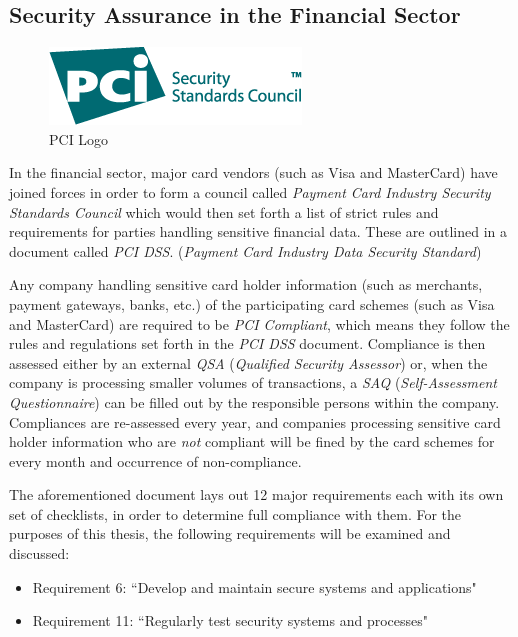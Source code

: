 \documentclass[a4paper,12pt]{article}
\begin{document}
\subsection{Security Assurance in the Financial Sector}

	\begin{figure}
		\vspace{-10pt}
		\centering
		\includegraphics[scale=0.5]{pci.png}
		\caption{PCI Logo}
	\end{figure}

	In the financial sector, major card vendors (such as Visa and MasterCard) have joined forces in order to form a council called \textit{Payment Card Industry Security Standards Council} which would then set forth a list of strict rules and requirements for parties handling sensitive financial data. These are outlined in a document called \textit{PCI DSS}. (\textit{Payment Card Industry Data Security Standard})
	
	Any company handling sensitive card holder information (such as merchants, payment gateways, banks, etc.) of the participating card schemes (such as Visa and MasterCard) are required to be \textit{PCI Compliant}, which means they follow the rules and regulations set forth in the \textit{PCI DSS} document. Compliance is then assessed either by an external \textit{QSA} (\textit{Qualified Security Assessor}) or, when the company is processing smaller volumes of transactions, a \textit{SAQ} (\textit{Self-Assessment Questionnaire}) can be filled out by the responsible persons within the company. Compliances are re-assessed every year, and companies processing sensitive card holder information who are \textit{not} compliant will be fined by the card schemes for every month and occurrence of non-compliance.\cite{wfargo15}
	
	The aforementioned document lays out 12 major requirements\cite{pcidss31} each with its own set of checklists, in order to determine full compliance with them. For the purposes of this thesis, the following requirements will be examined and discussed:
	
	\begin{itemize}
		\item Requirement 6: ``Develop and maintain secure systems and applications"
		\item Requirement 11: ``Regularly test security systems and processes"
	\end{itemize}
	
\end{document}
